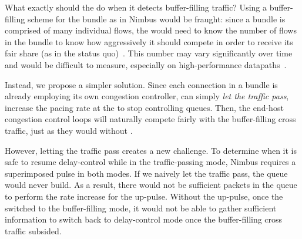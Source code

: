 What exactly should the \inbox do when it detects buffer-filling traffic? Using a buffer-filling scheme for the bundle as in Nimbus would be fraught: since a bundle is comprised of many individual flows, the \inbox would need to know the number of flows in the bundle to know how aggressively it should compete in order to receive its fair share (as in the status quo)~\cite{multcp}. 
This number may vary significantly over time and would be difficult to measure, especially on high-performance datapaths~\cite{heavy-hitters}.

Instead, we propose a simpler solution.
Since each connection in a bundle is already employing its own congestion controller, \name{} can simply \emph{let the traffic pass}, \ie{} increase the pacing rate at the \inbox to stop controlling queues.
Then, the end-host congestion control loops will naturally compete fairly with the buffer-filling cross traffic, just as they would without \name{}.

However, letting the traffic pass creates a new challenge. 
To determine when it is safe to resume delay-control while in the traffic-passing mode, Nimbus requires a superimposed pulse in both modes. If we naively let the traffic pass, the \inbox queue would never build. As a result, there would not be sufficient packets in the queue to perform the rate increase for the up-pulse. 
Without the up-pulse, once the \inbox{} switched to the buffer-filling mode, it would not be able to gather sufficient information to switch back to delay-control mode once the buffer-filling cross traffic subsided.

